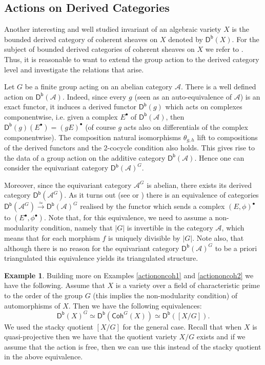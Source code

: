 \documentclass[10pt]{amsart}
\theoremstyle{definition}
\newtheorem{example}[theorem]{Example}
\begin{document}
\subsection{Actions on Derived Categories}\label{subsec:action on derived cats}
Another interesting and well studied invariant of an algebraic variety $X$ is the bounded derived category of coherent sheaves on $X$ denoted by $\mathsf{D^b}(X)$. For the subject of bounded derived categories of coherent sheaves on $X$ we refer  to \cite{MR2244106}. Thus, it is reasonable to want to extend the group action to the derived category level and investigate the relations that arise.

Let $G$ be a finite group acting on an abelian category $\mathcal{A}$. There is a well defined action on $\mathsf{D^b}(\mathcal{A})$.
Indeed, since every $g$ (seen as an auto-equivalence of $\mathcal{A}$) is an exact functor, it induces a derived functor $\mathsf{D^b}(g)$ which acts on complexes componentwise, i.e. given a complex $E^{\bullet}$ of $\mathsf{D^b}(\mathcal{A})$, then $\mathsf{D^b}(g) (E^{\bullet}) = (gE)^{\bullet}$ (of course $g$ acts also on differentials of the complex componentwise). The composition natural isomorphisms $\theta_{g,h}$ lift to compositions of the derived functors and the 2-cocycle condition also holds. This gives rise to the data of a group action on the additive category $\mathsf{D^b}(\mathcal{A})$. Hence one can consider the equivariant category $\mathsf{D^b}(\mathcal{A})^G$.

Moreover, since the equivariant category $\mathcal{A}^G$ is abelian, there exists its derived category $\mathsf{D^b}(\mathcal{A}^G)$.
As it turns out (see  \cite[Th. 7.1]{elagin2015equivarianttriangulatedcategories} or \cite[Prop. 13]{MR3334458}) there is an equivalence of categories $\mathsf{D^b}(\mathcal{A}^G) \xrightarrow{\simeq} \mathsf{D^b}(\mathcal{A})^G$ realised by the functor which sends a complex $(E, \phi)^{\bullet}$ to $(E^{\bullet} , \phi^{\bullet})$. Note that, for this equivalence, we need to assume a non-modularity condition, namely that $|G|$ is invertible in the category $\mathcal{A}$, which means that for each morphism $f$ is uniquely divisible by $|G|$. Note also, that although there is no reason for the equivariant category $\mathsf{D^b}(\mathcal{A})^G$ to be a priori triangulated this equivalence yields its triangulated structure.


\begin{example}\label{actiononcoh3}
Building more on Examples \ref{actiononcoh1} and \ref{actiononcoh2} we have the following. Assume that $X$ is a variety over a field of characteristic prime to the order of the group $G$ (this implies the non-modularity condition) of automorphisms of $X$. Then we have the following equivalences:
\[
\mathsf{D^b}(X)^G \simeq \mathsf{D^b}(\mathsf{Coh}^G(X)) \simeq \mathsf{D^b}([X/G]).
\]
We used the stacky quotient $[X/G]$ for the general case. Recall that when $X$ is quasi-projective then we have that the quotient variety $X/G$ exists and if we assume that the action is free, then we can use this instead of the stacky quotient in the above equivalence.
\end{example}
\end{document}
